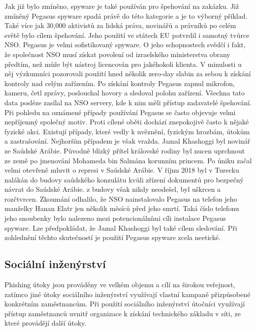Jak již bylo zmíněno, spyware je také používán pro špehování na zakázku.
Již zmíněný Pegasus spyware spadá právě do této kategorie a je to výborný příklad.
Také více jak 30,000 aktivistů za lidská práva, novinářů a právníků po celém světě bylo cílem špehování.
Jeho použití ve státech \ac{EU} potvrdil i samotný tvůrce NSO\@.
Pegasus je velmi sofistikovaný spyware.
O jeho schopnostech svědčí i fakt, že společnost NSO musí získat povolení od izraelského ministerstva obrany předtím, než může být nástroj licencován pro jakéhokoli klienta.
V minulosti u něj výzkumníci pozorovali použití hned několik zero-day slabin za sebou k získání kontroly nad celým zařízením.
Po získání kontroly Pegasus zapnul mikrofon, kameru, četl zprávy, poslouchal hovory a sledoval polohu zařízení.
Všechna tato data posléze zasílal na NSO servery, kde k nim měli přístup zadavatelé špehování.
Při pohledu na oznámené případy používání Pegasus se často objevuje velmi nepříjemný společný motiv.
Proti cílené oběti dochází znepokojivě často k nějaké fyzické akci.
Existují případy, které vedly k uvěznění, fyzickým hrozbám, útokům a zastrašování.
Nejhorším případem je však vražda.
Jamal Khashoggi byl novinář ze Saúdské Arábie.
Původně blízký přítel královské rodiny byl nucen uprchnout ze země po jmenování Mohameda bin Salmána korunním princem.
Po úniku začal velmi otevřeně mluvit o represi v Saúdské Arábie.
V říjnu 2018 byl v Turecku nalákán do budovy saúdského konzulátu kvůli zřízení dokumentů pro bezpečný návrat do Saúdské Arábie.
z budovy však nikdy neodešel, byl uškrcen a rozčtvrcen.
Zkoumání odhalilo, že NSO nainstalovalo Pegasus na telefon jeho manželky Hanan Elatr jen několik měsíců před jeho smrtí\cite{khashoggi_wife_pegasus}.
Taká číslo telefonu jeho snoubenky bylo nalezeno mezi potencionálními cíli instalace Pegasus spyware.
Lze předpokládat, že Jamal Khashoggi byl také cílem sledování.
Při zohlednění těchto skutečností je použití Pegasus spyware zcela neetické.\cite{darknet_100_NSO,Enisa_thread_landscape}

\subsection{Sociální inženýrství}


Phishing útoky jsou prováděny ve velkém objemu a cílí na širokou veřejnost, zatímco jiné útoky sociálního inženýrství využívají vlastní kampaně přizpůsobené konkrétním zaměstnancům. Při použití sociálního inženýrství útočníci využívají přístup zaměstnanců uvnitř organizace k získání technického základu v síti, ze které provádějí další útoky.

